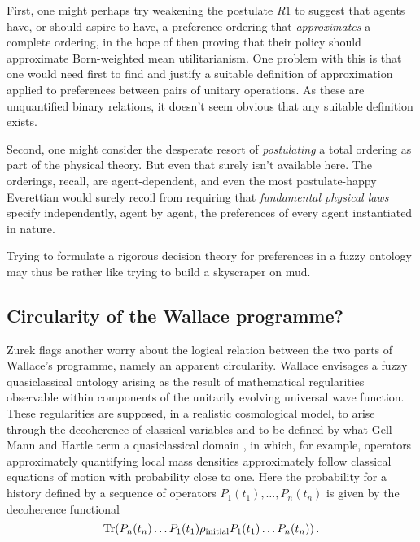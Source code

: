 \documentclass[aps,
pra,epsfig,12pt]{revtex4}
\def\Tr{{\rm{Tr}}}
\begin{document}
First, one might perhaps try weakening the postulate $R1$ to suggest that agents
have, or should aspire to have, a preference ordering that 
{\it approximates} a complete ordering, in the hope of then proving that
their policy should approximate Born-weighted mean
utilitarianism.  One problem with this is that one would need first
to find and justify a suitable definition of approximation applied to
preferences between pairs of unitary operations.   As these
are unquantified binary relations, it doesn't seem obvious that any
suitable definition exists. 

Second, one might consider the desperate resort of {\it postulating} 
a total ordering as part of the physical theory.  But even that surely 
isn't available here.  The orderings, recall, are
agent-dependent, and even the most postulate-happy Everettian would surely
recoil from requiring that {\it fundamental physical laws} specify 
independently, agent by agent, the preferences of every agent 
instantiated in nature.   

Trying to formulate a rigorous decision theory for preferences in a 
fuzzy ontology may thus be rather like trying to build a skyscraper on 
mud.  

\subsection{Circularity of the Wallace programme?} 

Zurek \cite{zurekvol} flags another worry about the
logical relation between the two parts \cite{wallacevolone,wallacevoltwo}
of Wallace's programme, namely an apparent circularity.   
Wallace envisages a fuzzy quasiclassical ontology
arising as the result of mathematical regularities observable within
components of the unitarily evolving universal wave function.  
These regularities are supposed, in a realistic cosmological model,
to arise through the decoherence of classical variables and to be
defined by what Gell-Mann and Hartle term a quasiclassical 
domain \cite{hartlevol}, in which, for example, operators
approximately quantifying local mass densities approximately 
follow classical equations of motion with probability close to one.   
Here the probability for a history defined by a sequence of 
operators $P_1 (t_1) , \ldots , P_n (t_n )$ is given by the 
decoherence functional
\begin{equation}
\Tr ( P_n (t_n ) \ldots P_1 (t_1 ) \rho_{{\rm initial}} P_1 (t_1 ) \ldots
P_n (t_n ) ) \, . 
\end{equation}
\end{document}

